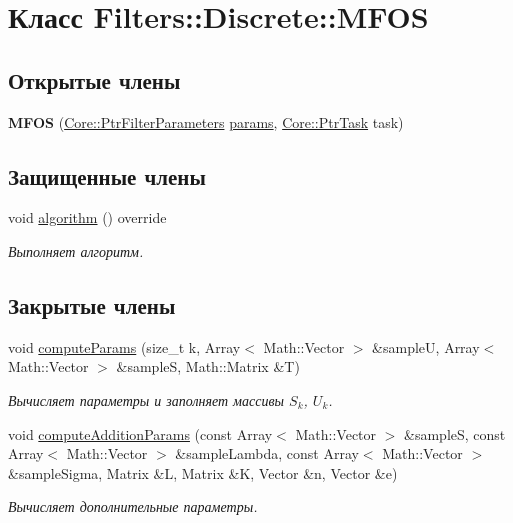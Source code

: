 \hypertarget{class_filters_1_1_discrete_1_1_m_f_o_s}{}\section{Класс Filters\+:\+:Discrete\+:\+:M\+F\+OS}
\label{class_filters_1_1_discrete_1_1_m_f_o_s}
\subsection*{Открытые члены}
\begin{DoxyCompactItemize}
\item 
\hypertarget{class_filters_1_1_discrete_1_1_m_f_o_s_a91cdbd25622c39f50c99f601aad6c238}{}\label{class_filters_1_1_discrete_1_1_m_f_o_s_a91cdbd25622c39f50c99f601aad6c238} 
{\bfseries M\+F\+OS} (\hyperlink{namespace_core_a4811af8148ba137d644b9a61a042cf03}{Core\+::\+Ptr\+Filter\+Parameters} \hyperlink{class_core_1_1_filter_a44aa749b49ba46256975ce545531ecf7}{params}, \hyperlink{namespace_core_abfda8f69fcacfcea2696549b548ed737}{Core\+::\+Ptr\+Task} task)
\end{DoxyCompactItemize}
\subsection*{Защищенные члены}
\begin{DoxyCompactItemize}
\item 
void \hyperlink{class_filters_1_1_discrete_1_1_m_f_o_s_a88e35ad4500d57e81be035959ab9bb5c}{algorithm} () override
\begin{DoxyCompactList}\small\item\em Выполняет алгоритм. \end{DoxyCompactList}\end{DoxyCompactItemize}
\subsection*{Закрытые члены}
\begin{DoxyCompactItemize}
\item 
void \hyperlink{class_filters_1_1_discrete_1_1_m_f_o_s_afb92a54a0aa1a7ecdcf527095849d123}{compute\+Params} (size\+\_\+t k, Array$<$ Math\+::\+Vector $>$ \&sampleU, Array$<$ Math\+::\+Vector $>$ \&sampleS, Math\+::\+Matrix \&T)
\begin{DoxyCompactList}\small\item\em Вычисляет параметры и заполняет массивы $S_{k}$, $U_k$. \end{DoxyCompactList}\item 
void \hyperlink{class_filters_1_1_discrete_1_1_m_f_o_s_a0d4feb8bdd7bc3ec30a31df3ca4e13d6}{compute\+Addition\+Params} (const Array$<$ Math\+::\+Vector $>$ \&sampleS, const Array$<$ Math\+::\+Vector $>$ \&sample\+Lambda, const Array$<$ Math\+::\+Vector $>$ \&sample\+Sigma, Matrix \&L, Matrix \&K, Vector \&n, Vector \&e)
\begin{DoxyCompactList}\small\item\em Вычисляет дополнительные параметры. \end{DoxyCompactList}\end{DoxyCompactItemize}
